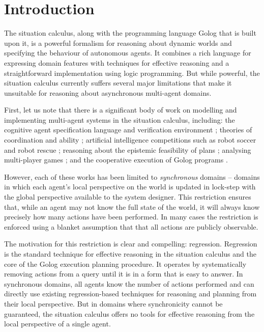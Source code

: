 

\chapter{Introduction}

\label{ch:intro}

The situation calculus, along with the programming language Golog
that is built upon it, is a powerful formalism for reasoning about
dynamic worlds and specifying the behaviour of autonomous agents.
It combines a rich language for expressing domain features with techniques
for effective reasoning and a straightforward implementation using
logic programming. But while powerful, the situation calculus currently
suffers several major limitations that make it unsuitable for reasoning
about asynchronous multi-agent domains.

First, let us note that there is a significant body of work on modelling
and implementing multi-agent systems in the situation calculus, including:
the cognitive agent specification language and verification environment
\citep{shapiro02casl}; theories of coordination and ability \citep{ghaderi07sc_joint_ability};
artificial intelligence competitions such as robot soccer \citep{Ferrein2005readylog}
and robot rescue \citep{farinelli07team_golog}; reasoning about the
epistemic feasibility of plans \citep{Lesperance01epi_feas_casl};
analysing multi-player games \citep{delgrande01sitcalc_cleudo}; and
the cooperative execution of Golog programs \citep{Ferrein2005readylog,kelly06hlp_dps}.

However, each of these works has been limited to \emph{synchronous}
domains -- domains in which each agent's local perspective on the
world is updated in lock-step with the global perspective available
to the system designer. This restriction ensures that, while an agent
may not know the full state of the world, it will always know precisely
how many actions have been performed. In many cases the restriction
is enforced using a blanket assumption that that all actions are publicly
observable.

The motivation for this restriction is clear and compelling: regression.
Regression is the standard technique for effective reasoning in the
situation calculus and the core of the Golog execution planning procedure.
It operates by systematically removing actions from a query until
it is in a form that is easy to answer. In synchronous domains, all
agents know the number of actions performed and can directly use existing
regression-based techniques for reasoning and planning from their
local perspective. But in domains where synchronicity cannot be guaranteed,
the situation calculus offers no tools for effective reasoning from
the local perspective of a single agent.

